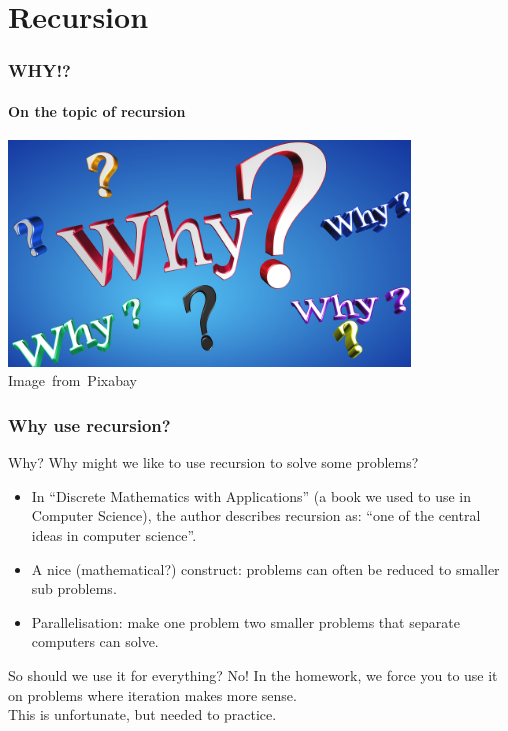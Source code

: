 \section{Recursion}
\label{sec:recursion}

\begin{frame}
	\frametitle{WHY!?}
	\framesubtitle{On the topic of recursion}
\begin{center}
	\includegraphics[width=0.8\textwidth]{figures/why.png}\\
	\hspace*{15pt}\hbox{\scriptsize Image from Pixabay}
\end{center}	
\end{frame}

\begin{frame}
	\frametitle{Why use recursion?}
	\begin{questionblock}{Why?}
		Why might we like to use recursion to solve some problems?
	\end{questionblock}
	\pause
	\begin{answerblock}{}
		\small
		\begin{itemize}
			\item In ``Discrete Mathematics with Applications'' (a book we used to use in Computer Science), the author
				describes recursion as: ``one of the central ideas in computer science''.
			\pause
			\vspace{-5pt}
			\item A nice (mathematical?) construct: problems can often be reduced to smaller sub problems.
			\pause
			\vspace{-5pt}
			\item Parallelisation: make one problem two smaller problems that separate computers can solve.
		\end{itemize}	
	\end{answerblock}
	\pause
		\begin{alertblock}{So should we use it for everything? No!}
			\small
			In the homework, we force you to use it on problems where iteration makes more sense.\\
			This is unfortunate, but needed to practice.
		\end{alertblock}	
\end{frame}


